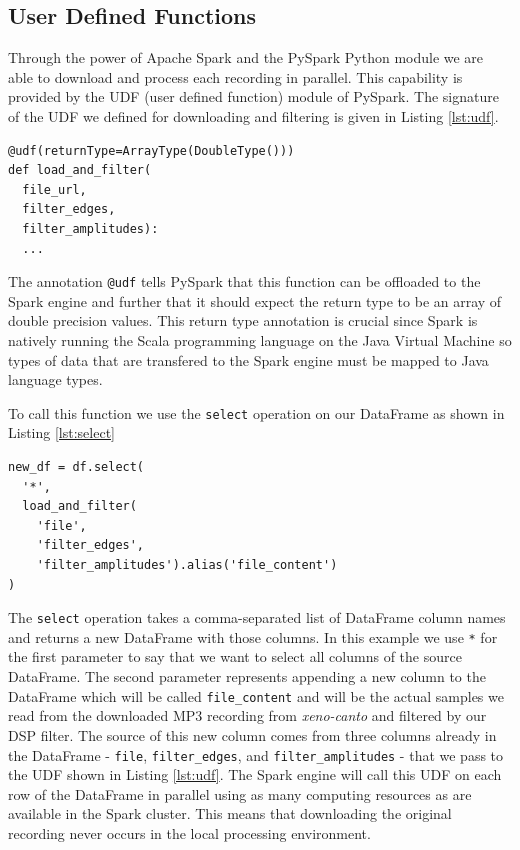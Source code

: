 \documentclass[conference,twoside]{IEEEtran}
\newcommand{\code}[1]{\texttt{#1}}
\begin{document}
\subsection{User Defined Functions}
Through the power of Apache Spark and the PySpark Python module we are able to download and process each recording in parallel. This capability is provided by the UDF (user defined function) module of PySpark. The signature of the UDF we defined for downloading and filtering is given in Listing \ref{lst:udf}.
\begin{lstlisting}[language=Txt, caption={PySpark User Defined Functions}, label={lst:udf}]
@udf(returnType=ArrayType(DoubleType()))
def load_and_filter(
  file_url,
  filter_edges,
  filter_amplitudes):
  ...
\end{lstlisting}
The annotation \code{@udf} tells PySpark that this function can be offloaded to the Spark engine and further that it should expect the return type to be an array of double precision values. This return type annotation is crucial since Spark is natively running the Scala programming language on the Java Virtual Machine so types of data that are transfered to the Spark engine must be mapped to Java language types.

To call this function we use the \code{select} operation on our DataFrame as shown in Listing \ref{lst:select}
\begin{lstlisting}[language=Txt, caption={PySpark DataFrame Select()}, label={lst:select}]
new_df = df.select(
  '*',
  load_and_filter(
    'file',
    'filter_edges',
    'filter_amplitudes').alias('file_content')
)
\end{lstlisting}
The \code{select} operation takes a comma-separated list of DataFrame column names and returns a new DataFrame with those columns. In this example we use \code{*} for the first parameter to say that we want to select all columns of the source DataFrame. The second parameter represents appending a new column to the DataFrame which will be called \code{file\_content} and will be the actual samples we read from the downloaded MP3 recording from \textit{xeno-canto} and filtered by our DSP filter. The source of this new column comes from three columns already in the DataFrame - \code{file}, \code{filter\_edges}, and \code{filter\_amplitudes} - that we pass to the UDF shown in Listing \ref{lst:udf}. The Spark engine will call this UDF on each row of the DataFrame in parallel using as many computing resources as are available in the Spark cluster. This means that downloading the original recording never occurs in the local processing environment.
\end{document}
